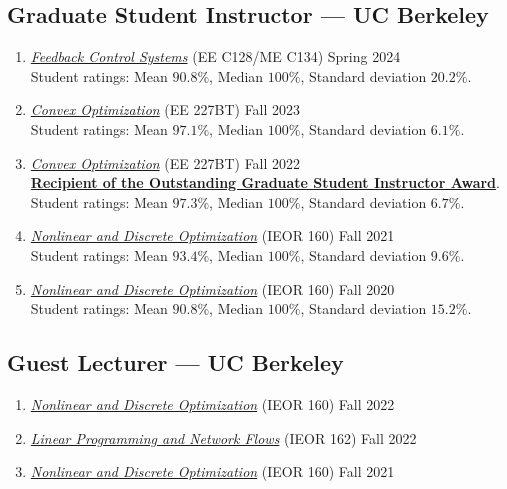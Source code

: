 \documentclass[11pt]{article}
\newcommand{\subsectionskip}{\baselineskip}	%
\newcommand{\cvdate}[1]{\hfill#1}			%
\begin{document}
	\subsection{Graduate Student Instructor --- UC Berkeley}
	\begin{enumerate}[label={\arabic*.}]
		\item \href{https://people.eecs.berkeley.edu/~sojoudi/Course_EE128_SP_2024.html}{\textit{Feedback Control Systems}} (EE C128/ME C134) \cvdate{Spring 2024} \\
		Student ratings: Mean $90.8\%$, Median $100\%$, Standard deviation $20.2\%$.
		\item \href{https://classes.berkeley.edu/content/2023-fall-eleng-227bt-001-lec-001}{\textit{Convex Optimization}} (EE 227BT) \cvdate{Fall 2023} \\
		Student ratings: Mean $97.1\%$, Median $100\%$, Standard deviation $6.1\%$.
		\item \href{https://classes.berkeley.edu/content/2022-fall-eleng-227bt-001-lec-001}{\textit{Convex Optimization}} (EE 227BT) \cvdate{Fall 2022} \\
		\textbf{\href{https://gsi.berkeley.edu/programs-services/award-programs/ogsi/ogsi-recipients-2022-2023/}{Recipient of the Outstanding Graduate Student Instructor Award}}. \\
		Student ratings: Mean $97.3\%$, Median $100\%$, Standard deviation $6.7\%$.
		\item \href{https://lavaei.ieor.berkeley.edu/Course_IEOR160_Fall_2021.html}{\textit{Nonlinear and Discrete Optimization}} (IEOR 160) \cvdate{Fall 2021} \\
		Student ratings: Mean $93.4\%$, Median $100\%$, Standard deviation $9.6\%$.
		\item \href{https://lavaei.ieor.berkeley.edu/Course_IEOR160_Fall_2020.html}{\textit{Nonlinear and Discrete Optimization}} (IEOR 160) \cvdate{Fall 2020} \\
		Student ratings: Mean $90.8\%$, Median $100\%$, Standard deviation $15.2\%$.
	\end{enumerate}
	
	\vspace*{\subsectionskip}

	\subsection{Guest Lecturer --- UC Berkeley}

	\begin{enumerate}[label={\arabic*.}]
		\item \href{https://lavaei.ieor.berkeley.edu/Course_IEOR160_Fall_2022.html}{\textit{Nonlinear and Discrete Optimization}} (IEOR 160) \cvdate{Fall 2022}
		\item \href{https://lavaei.ieor.berkeley.edu/Course_IEOR162_Fall_2022.html}{\textit{Linear Programming and Network Flows}} (IEOR 162) \cvdate{Fall 2022}
		\item \href{https://lavaei.ieor.berkeley.edu/Course_IEOR160_Fall_2021.html}{\textit{Nonlinear and Discrete Optimization}} (IEOR 160) \cvdate{Fall 2021}
	\end{enumerate}
\end{document}
